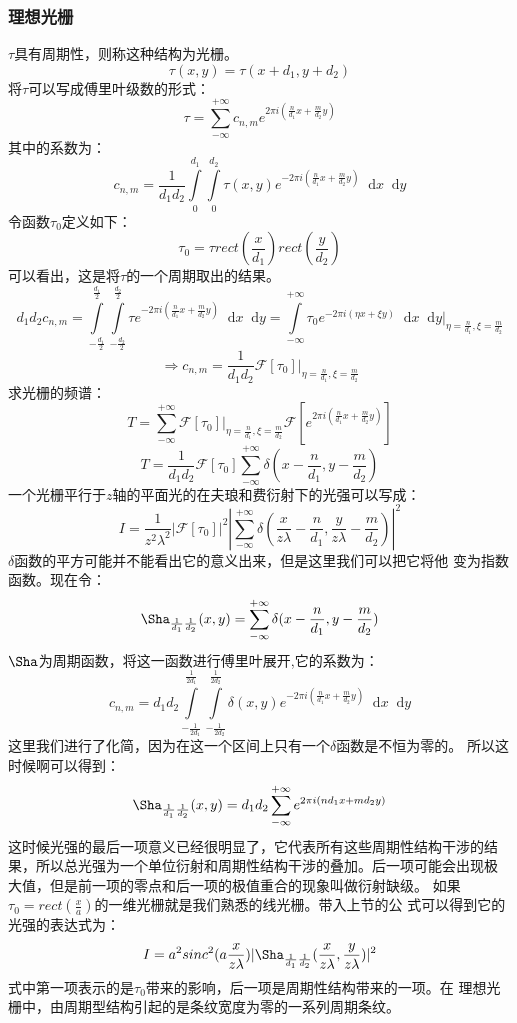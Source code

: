 \documentclass{article}
\newcommand*{\dif}{\mathop{}\!\mathrm{d}}
\begin{document}
\subsubsection{理想光栅}
$\tau$具有周期性，则称这种结构为光栅。
\[\tau(x,y)=\tau(x+d_1,y+d_2)\]
将$\tau$可以写成傅里叶级数的形式：
\[\tau=\sum_{-\infty}^{+\infty}c_{n,m}e^{2\pi
    i(\frac{n}{d_1}x+\frac{m}{d_2}y)}\]
其中的系数为：
\[c_{n,m}=\frac{1}{d_1d_2}\int\limits_0^{d_1}\int\limits_0^{d_2}\tau(x,y)e^{-2\pi
    i(\frac{n}{d_1}x+\frac{m}{d_2}y)}\dif x\dif y\]
令函数$\tau_0$定义如下：
\[\tau_0=\tau rect(\frac{x}{d_1})rect(\frac{y}{d_2})\]
可以看出，这是将$\tau$的一个周期取出的结果。
\[d_1d_2c_{n,m}=\int\limits_{-\frac{d_1}{2}}^{\frac{d_1}{2}}\int\limits_{-\frac{d_2}{2}}^{\frac{d_2}{2}}\tau
  e^{-2\pi i(\frac{n}{d_1}x+\frac{m}{d_2}y)}\dif
  x\dif y=\int\limits_{-\infty}^{+\infty}\tau_0e^{-2\pi i(\eta x+\xi
    y)}\dif x\dif y|_{\eta=\frac{n}{d_1},\xi=\frac{m}{d_2}}\]
\[\Rightarrow
  c_{n,m}=\frac{1}{d_1d_2}\mathscr{F}[\tau_0]|_{\eta=\frac{n}{d_1},\xi=\frac{m}{d_2}}\]
求光栅的频谱：
\[T=\sum_{-\infty}^{+\infty}\mathscr{F}[\tau_0]|_{\eta=\frac{n}{d_1},\xi=\frac{m}{d_2}}\mathscr{F}[e^{2\pi
    i(\frac{n}{d_1}x+\frac{m}{d_2}y)}]\]
\begin{equation}
  \label{eq:10}
  T=\frac{1}{d_1d_2}\mathscr{F}[\tau_0]\sum_{-\infty}^{+\infty}\delta(x-\frac{n}{d_{1}},y-\frac{m}{d_2})
\end{equation}
一个光栅平行于$z$轴的平面光的在夫琅和费衍射下的光强可以写成：
\[I=\frac{1}{z^2\lambda^2}|\mathscr{F}[\tau_0]|^2|\sum_{-\infty}^{+\infty}\delta(\frac{x}{z\lambda}-\frac{n}{d_1},\frac{y}{z\lambda}-\frac{m}{d_2})|^2\]
$\delta$函数的平方可能并不能看出它的意义出来，但是这里我们可以把它将他
变为指数函数。现在令：
\[\Sha_{\frac{1}{d_1}\frac{1}{d_2}}(x,y)=\sum_{-\infty}^{+\infty}\delta(x-\frac{n}{d_1},y-\frac{m}{d_2})\]
$\Sha$为周期函数，将这一函数进行傅里叶展开,它的系数为：
\[c_{n,m}=d_1d_2
  \int\limits_{-\frac{1}{2d_1}}^{\frac{1}{2d_1}}\int\limits_{-\frac{1}{2d_2}}^{\frac{1}{2d_2}}\delta(x,y)e^{-2\pi
    i(\frac{n}{d_1}x+\frac{m}{d_2}y)}\dif
  x\dif y\]
这里我们进行了化简，因为在这一个区间上只有一个$\delta$函数是不恒为零的。
所以这时候啊可以得到：
\[\Sha_{\frac{1}{d_1}\frac{1}{d_2}}(x,y)=d_1d_2\sum_{-\infty}^{+\infty}e^{2\pi
    i(nd_1x+md_2y)}\]
这时候光强的最后一项意义已经很明显了，它代表所有这些周期性结构干涉的结
果，所以总光强为一个单位衍射和周期性结构干涉的叠加。后一项可能会出现极
大值，但是前一项的零点和后一项的极值重合的现象叫做衍射缺级。
如果$\tau_0=rect(\frac{x}{a})$的一维光栅就是我们熟悉的线光栅。带入上节的公
式可以得到它的光强的表达式为：
\[I=a^2sinc^2(a
  \frac{x}{z\lambda})|\Sha_{\frac{1}{d_1}\frac{1}{d_2}}(\frac{x}{z\lambda},\frac{y}{z\lambda})|^2\]
式中第一项表示的是$\tau_0$带来的影响，后一项是周期性结构带来的一项。在
理想光栅中，由周期型结构引起的是条纹宽度为零的一系列周期条纹。
\end{document}
